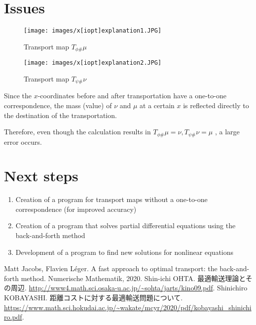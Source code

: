 \documentclass[a4j,10pt, twocolumn, dvipdfmx]{article}
\theoremstyle{definition}
\begin{document}
\section{Issues}

\begin{figure}[htbp]
    \begin{center}
        \texttt{[image: images/x[iopt]explanation1.JPG]}
        \caption{Transport map $T_{\phi \#} \mu$}
        \texttt{[image: images/x[iopt]explanation2.JPG]}
        \caption{Transport map $T_{\psi \#} \nu$}
    \end{center}
\end{figure}
\label{x[iopt]explanation}

Since the $x$-coordinates before and after transportation have a one-to-one correspondence, 
the mass (value) of $\nu$ and $\mu$ at a certain $x$ is reflected directly to the destination of the transportation.

Therefore, even though the calculation results in $T_{\phi \#} \mu = \nu, T_{\psi \#} \nu = \mu$ , a large error occurs.
\section{Next steps}
\begin{enumerate}
    \item Creation of a program for transport maps without a one-to-one correspondence (for improved accuracy)
    \item Creation of a program that solves partial differential equations using the back-and-forth method
    \item Development of a program to find new solutions for nonlinear equations
\end{enumerate}


\begin{thebibliography}{99}
    Matt Jacobs, Flavien Léger.
    \newblock A fast approach to optimal transport: the back-and-forth method.
    \newblock Numerische Mathematik, 2020. 
    Shin-ichi OHTA.
    \newblock 最適輸送理論とその周辺.
    \newblock \url{http://www4.math.sci.osaka-u.ac.jp/~sohta/jarts/kino09.pdf}.
    Shinichiro KOBAYASHI.
    \newblock 距離コストに対する最適輸送問題について.
    \newblock \url{https://www.math.sci.hokudai.ac.jp/~wakate/mcyr/2020/pdf/kobayashi_shinichiro.pdf}.

    \end{thebibliography}
\end{document}
